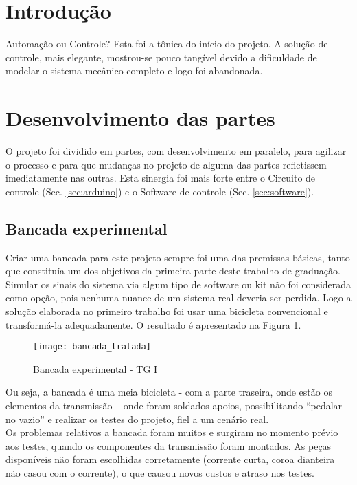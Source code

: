 \documentclass[a4paper,11pt]{article}
\begin{document}
\pagebreak
%
\section{Introdução}
\label{sec:intro}
Automação ou Controle? Esta foi a tônica do início do projeto. A solução de
controle, mais elegante, mostrou-se pouco tangível devido a dificuldade de
modelar o sistema mecânico completo e logo foi abandonada.

\pagebreak
%
\section{Desenvolvimento das partes}
\label{sec:partes}
O projeto foi dividido em partes, com desenvolvimento em paralelo, para agilizar
o processo e para que mudanças no projeto de alguma das partes refletissem
imediatamente nas outras. Esta sinergia foi mais forte entre o Circuito de
controle (Sec. \ref{sec:arduino}) e o Software de controle (Sec.
\ref{sec:software}).

\subsection{Bancada experimental}
\label{sec:bancada}
Criar uma bancada para este projeto sempre foi uma das premissas básicas, tanto
que constituía um dos objetivos da primeira parte deste trabalho de graduação.
Simular os sinais do sistema via algum tipo de software ou kit não foi
considerada como opção, pois nenhuma nuance de um sistema real deveria ser
perdida. Logo a solução elaborada no primeiro trabalho foi usar uma bicicleta
convencional e transformá-la adequadamente. O resultado é apresentado na Figura
\ref{fig:bancada}.
\begin{figure}[ht]
 \begin{center}
  \texttt{[image: bancada\_tratada]}
 \end{center}
 \caption{Bancada experimental - TG I}
 \label{fig:bancada}
\end{figure}
Ou seja, a bancada é uma meia bicicleta - com a parte traseira, onde estão os
elementos da transmissão  -- onde foram soldados apoios, possibilitando
``pedalar no vazio'' e realizar os testes do projeto, fiel a um cenário real. \\
Os problemas relativos a bancada foram muitos e surgiram no momento prévio aos
testes, quando os componentes da transmissão foram montados. As peças
disponíveis não foram escolhidas corretamente (corrente curta, coroa dianteira
não casou com o corrente), o que causou novos custos e atraso nos testes.
\end{document}

